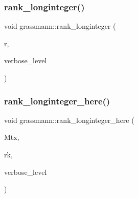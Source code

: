 \mbox{\label{classgrassmann_a906995e619188ae6e2e4e97f1e878a08}} 
\subsubsection{\texorpdfstring{rank\+\_\+longinteger()}{rank\_longinteger()}}
{\footnotesize\ttfamily void grassmann\+::rank\+\_\+longinteger (\begin{DoxyParamCaption}\item[{\mbox{\hyperlink{classlonginteger__object}{longinteger\+\_\+object}} \&}]{r,  }\item[{\mbox{\hyperlink{galois_8h_a09fddde158a3a20bd2dcadb609de11dc}{I\+NT}}}]{verbose\+\_\+level }\end{DoxyParamCaption})}

\mbox{\label{classgrassmann_a9f3af02709205bca69e61d529e921212}} 
\subsubsection{\texorpdfstring{rank\+\_\+longinteger\+\_\+here()}{rank\_longinteger\_here()}}
{\footnotesize\ttfamily void grassmann\+::rank\+\_\+longinteger\+\_\+here (\begin{DoxyParamCaption}\item[{\mbox{\hyperlink{galois_8h_a09fddde158a3a20bd2dcadb609de11dc}{I\+NT}} $\ast$}]{Mtx,  }\item[{\mbox{\hyperlink{classlonginteger__object}{longinteger\+\_\+object}} \&}]{rk,  }\item[{\mbox{\hyperlink{galois_8h_a09fddde158a3a20bd2dcadb609de11dc}{I\+NT}}}]{verbose\+\_\+level }\end{DoxyParamCaption})}

\mbox{\label{classgrassmann_a165895ffdd3346a3eae9dc20fc2dfcfd}} 
